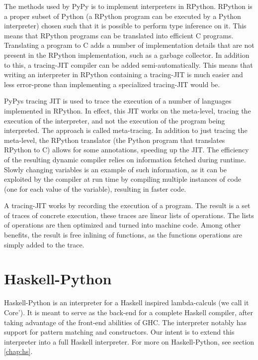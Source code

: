 The methods used by PyPy is to implement interpreters in RPython. RPython is a proper 
subset of Python (a RPython program can be executed by a Python interpreter) 
chosen such that it is possible to perform type inference on it. This
means that RPython programs can be translated into efficient C programs. Translating a 
program to C adds a number of implementation details that are not present in the RPython
implementation, such as a garbage collector. In addition to this, a tracing-JIT compiler 
can be added semi-automatically. This means that writing an interpreter in RPython containing
a tracing-JIT is much easier and less error-prone than implementing a specialized tracing-JIT
would be. 
\cite{bolz2011runtime}

PyPys tracing JIT is used to trace the execution of a number of languages implemented 
in RPython. In effect,
this JIT works on the meta-level, tracing the execution of the interpreter, and not the 
execution of the program being interpreted. The approach is called meta-tracing. In addition
to just tracing the meta-level, the RPython translator (the Python program that translates
RPython to C) allows for some annotations, speeding up the JIT. The efficiency of the 
resulting dynamic compiler relies on information fetched during runtime. Slowly changing 
variables is an example of such information, as it can be exploited by the compiler at 
run time by compiling multiple instances of code (one for each value of the variable),
resulting in faster code. \cite{bolz2011runtime}

A tracing-JIT works by recording the execution of a program. The result is a set of 
traces of concrete execution, these traces are linear lists of operations. The lists of
operations are then optimized and turned into machine code. Among other benefits, the
result is free inlining of functions, as the functions operations are simply added to
the trace. \cite{bolz2011runtime}

\section{Haskell-Python}

Haskell-Python\cite{haskellpython}
is an interpreter for a Haskell inspired lambda-calculs (we call it Core'). 
It is meant to serve as the back-end for a complete Haskell compiler, after taking advantage 
of the front-end abilities of GHC. The interpreter notably has support for pattern matching 
and constructors. Our intent is to extend this interpreter into a full Haskell interpreter.
For more on Haskell-Python, see section \ref{chap:hs}.

